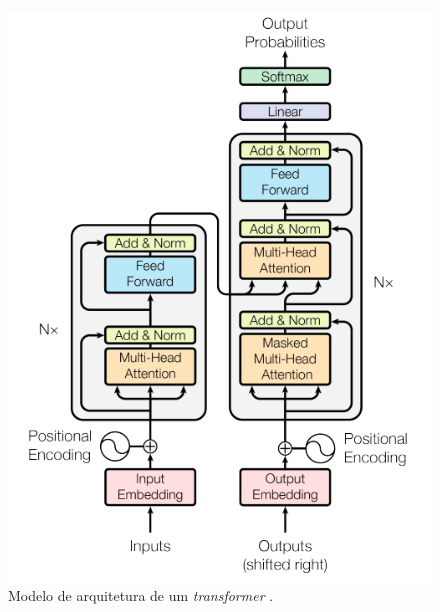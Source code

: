 \begin{figure}[!htbp]
	\centering
	\includegraphics[scale=0.6]{imagens/arch-transformers.png}
    \caption {Modelo de arquitetura de um \textit{transformer} \cite{GoogleTeamTransformers}.}
\end{figure}




